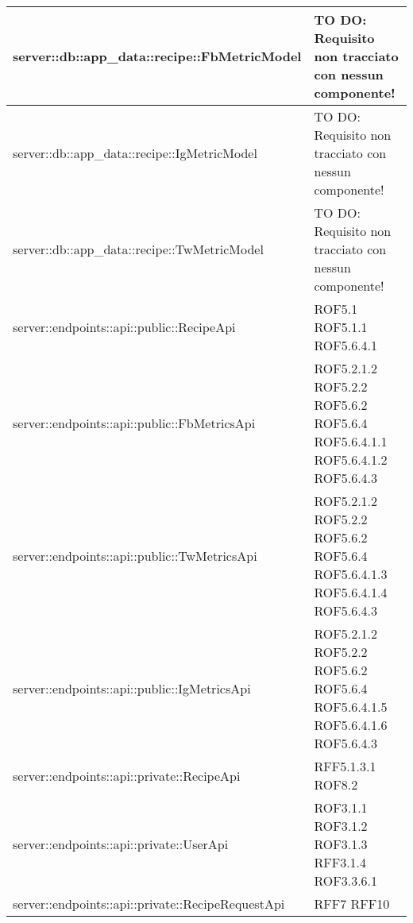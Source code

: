\begin{center}
\begin{longtable}{| p{11cm} | p{2.5cm} |}
\hline
server::db::app\_data::recipe::FbMetricModel & TO DO: Requisito non tracciato con nessun componente! \\
\hline
server::db::app\_data::recipe::IgMetricModel & TO DO: Requisito non tracciato con nessun componente! \\
\hline
server::db::app\_data::recipe::TwMetricModel & TO DO: Requisito non tracciato con nessun componente! \\
\hline
server::endpoints::api::public::RecipeApi & ROF5.1 \newline ROF5.1.1 \newline ROF5.6.4.1 \\
\hline
server::endpoints::api::public::FbMetricsApi & ROF5.2.1.2 \newline ROF5.2.2 \newline ROF5.6.2 \newline ROF5.6.4 \newline ROF5.6.4.1.1 \newline ROF5.6.4.1.2 \newline ROF5.6.4.3 \\
\hline
server::endpoints::api::public::TwMetricsApi & ROF5.2.1.2 \newline ROF5.2.2 \newline ROF5.6.2 \newline ROF5.6.4 \newline ROF5.6.4.1.3 \newline ROF5.6.4.1.4 \newline ROF5.6.4.3 \\
\hline
server::endpoints::api::public::IgMetricsApi & ROF5.2.1.2 \newline ROF5.2.2 \newline ROF5.6.2 \newline ROF5.6.4 \newline ROF5.6.4.1.5 \newline ROF5.6.4.1.6 \newline ROF5.6.4.3 \\
\hline
server::endpoints::api::private::RecipeApi & RFF5.1.3.1 \newline ROF8.2 \\
\hline
server::endpoints::api::private::UserApi & ROF3.1.1 \newline ROF3.1.2 \newline ROF3.1.3 \newline RFF3.1.4 \newline ROF3.3.6.1 \\
\hline
server::endpoints::api::private::RecipeRequestApi & RFF7 \newline RFF10 \\

\end{longtable}
\end{center}
